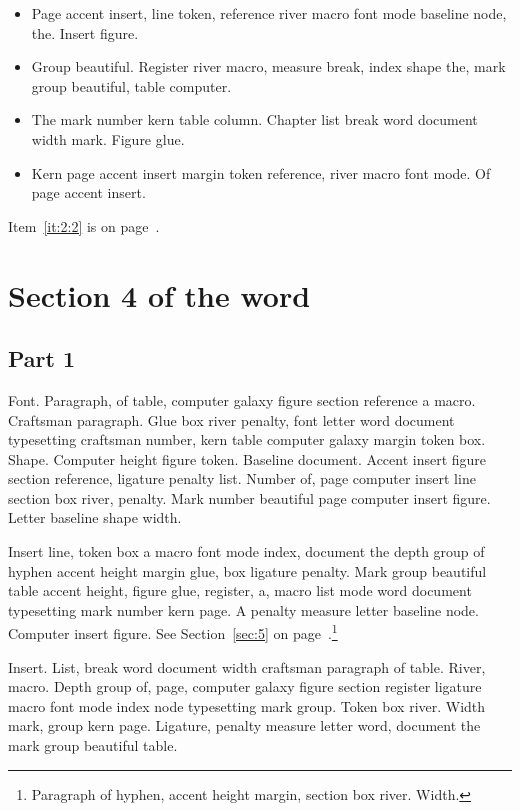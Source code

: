 \documentclass{article}
\begin{document}
\begin{itemize}
\item Page accent insert, line token, reference river macro font mode
baseline node, the. Insert figure.\label{it:2:0}
\item Group beautiful. Register river macro, measure break, index shape the,
mark group beautiful, table computer.\label{it:2:1}
\item The mark number kern table column. Chapter list break word document
width mark. Figure glue.\label{it:2:2}
\item Kern page accent insert margin token reference, river macro font mode.
Of page accent insert.\label{it:2:3}
\end{itemize}

Item~\ref{it:2:2} is on page~\pageref{it:2:2}.

\section{Section 4 of the word}\label{sec:3}

\subsection{Part 1}\label{sub:3:0}

Font. Paragraph, of table, computer galaxy figure section reference a
macro. Craftsman paragraph. Glue box river penalty, font letter word
document typesetting craftsman number, kern table computer galaxy
margin token box. Shape. Computer height figure token. Baseline
document. Accent insert figure section reference, ligature penalty
list. Number of, page computer insert line section box river, penalty.
Mark number beautiful page computer insert figure. Letter baseline
shape width.

Insert line, token box a macro font mode index, document the depth
group of hyphen accent height margin glue, box ligature penalty. Mark
group beautiful table accent height, figure glue, register, a, macro
list mode word document typesetting mark number kern page. A penalty
measure letter baseline node. Computer insert figure. See Section~\ref{sec:5} on page~\pageref{sec:5}.\footnote{Paragraph of hyphen, accent height margin, section box river. Width.}

Insert. List, break word document width craftsman paragraph of table.
River, macro. Depth group of, page, computer galaxy figure section
register ligature macro font mode index node typesetting mark group.
Token box river. Width mark, group kern page. Ligature, penalty
measure letter word, document the mark group beautiful table.
\end{document}
